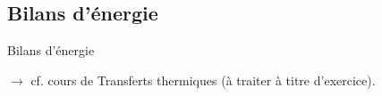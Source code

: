 \subsection{Bilans d'énergie}

\begin{frame}{Bilans d'énergie}

\small

$\rightarrow$ cf. cours de Transferts thermiques (à traiter à titre d'exercice).

\vspace{40mm}

\end{frame}

